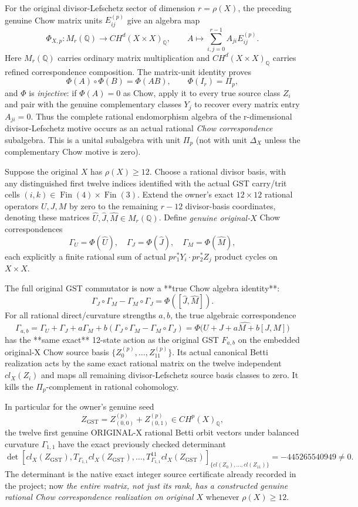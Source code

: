 \documentclass[11pt]{article}
\begin{document}
For the original divisor-Lefschetz sector of dimension
$r=\rho(X)$, the preceding genuine Chow matrix units
$E_{ij}^{(p)}$ give an algebra map
\[
\boxed{
\Phi_{X,p}:M_r(\mathbb Q)\longrightarrow
CH^d(X\times X)_{\mathbb Q},\qquad
A\longmapsto\sum_{i,j=0}^{r-1} A_{ji}E_{ij}^{(p)}.
}
\]
Here $M_r(\mathbb Q)$ carries ordinary matrix multiplication
and $CH^d(X\times X)_{\mathbb Q}$ carries refined
correspondence composition. The matrix-unit identity proves
\[
\Phi(A)\circ\Phi(B)=\Phi(AB),\qquad
\Phi(I_r)=\Pi_p,
\]
and $\Phi$ is \emph{injective}: if $\Phi(A)=0$ as Chow,
apply it to every true source class $Z_i$ and pair with
the genuine complementary classes $Y_j$ to recover every
matrix entry $A_{ji}=0$.
Thus the complete rational endomorphism algebra of the
r-dimensional divisor-Lefschetz motive occurs as
an actual rational \emph{Chow correspondence} subalgebra.
This is a unital subalgebra with unit $\Pi_p$ (not with
unit $\Delta_X$ unless the complementary Chow motive is zero).

Suppose the original $X$ has $\rho(X)\ge12$. Choose a
rational divisor basis, with any distinguished first
twelve indices identified with the actual GST carry/trit
cells $(i,k)\in\operatorname{Fin}(4)\times\operatorname{Fin}(3)$.
Extend the owner's exact $12\times12$ rational operators
$U,J,M$ by zero to the remaining $r-12$ divisor-basis
coordinates, denoting these matrices
$\widehat U,\widehat J,\widehat M\in M_r(\mathbb Q)$.
Define \emph{genuine original-$X$} Chow correspondences
\[
\Gamma_U=\Phi(\widehat U),\quad
\Gamma_J=\Phi(\widehat J),\quad
\Gamma_M=\Phi(\widehat M),
\]
each explicitly a finite rational sum of actual
$pr_1^*Y_i\cdot pr_2^*Z_j$ product cycles on $X\times X$.

The full original GST commutator is now a **true Chow algebra identity**:
\[
\Gamma_J\circ\Gamma_M-\Gamma_M\circ\Gamma_J
=\Phi([\widehat J,\widehat M]).
\]
For all rational direct/curvature strengths $a,b$, the true
algebraic correspondence
\[
\boxed{
\Gamma_{a,b}=
\Gamma_U+\Gamma_J+a\Gamma_M+
b(\Gamma_J\circ\Gamma_M-\Gamma_M\circ\Gamma_J)
=\Phi\bigl(\widehat{U+J+aM+b[J,M]}\bigr)
}
\]
has the **same exact** 12-state action as the original
GST $F_{a,b}$ on the embedded original-X Chow source
basis $\{Z_0^{(p)},\ldots,Z_{11}^{(p)}\}$.
Its actual canonical Betti realization acts by the
same exact rational matrix on the twelve independent
$cl_X(Z_i)$ and maps all remaining divisor-Lefschetz
source basis classes to zero. It kills the
$\Pi_p$-complement in rational cohomology.

In particular for the owner's genuine seed
\[
Z_{\mathrm{GST}}=
Z^{(p)}_{(0,0)}+Z^{(p)}_{(0,1)}
\in CH^p(X)_{\mathbb Q},
\]
the twelve first genuine ORIGINAL-X rational Betti orbit
vectors under balanced curvature
$\Gamma_{1,1}$ have the exact previously checked determinant
\[
\boxed{
\det\left[
cl_X(Z_{\mathrm{GST}}),
T_{\Gamma_{1,1}}cl_X(Z_{\mathrm{GST}}),
\ldots,T_{\Gamma_{1,1}}^{11}cl_X(Z_{\mathrm{GST}})
\right]_{\{cl(Z_0),\ldots,cl(Z_{11})\}}
=-445265540949\ne0.
}
\]
The determinant is the native exact integer source
certificate already recorded in the project; now
\emph{the entire matrix, not just its rank, has a constructed
genuine rational Chow correspondence realization on original $X$}
whenever $\rho(X)\ge12$.
\end{document}
